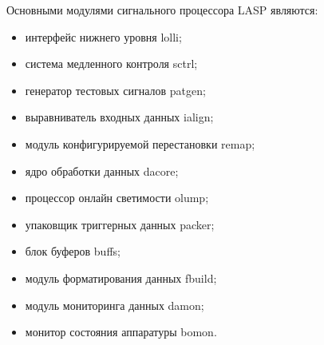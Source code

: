 Основными модулями сигнального процессора LASP являются:\par
\begin{itemize}
    \item интерфейс нижнего уровня lolli;
    \item система медленного контроля sctrl;
    \item генератор тестовых сигналов patgen;
    \item выравниватель входных данных ialign;
    \item модуль конфигурируемой перестановки remap;
    \item ядро обработки данных dacore;
    \item процессор онлайн светимости olump;
    \item упаковщик триггерных данных packer;
    \item блок буферов buffs;
    \item модуль форматирования данных fbuild;
    \item модуль мониторинга данных damon;
    \item монитор состояния аппаратуры bomon.
\end{itemize}\par

